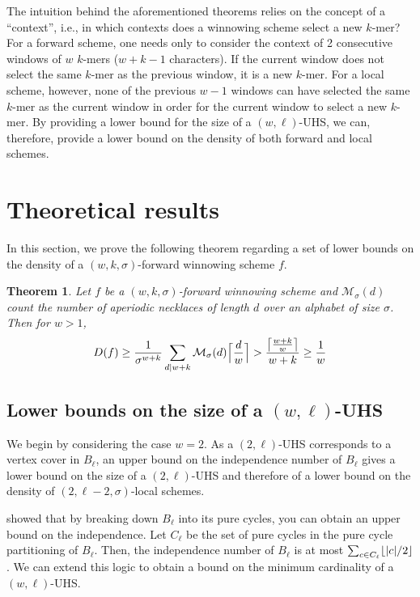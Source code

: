 \documentclass{article}
\newtheorem{theorem}{Theorem}[section]
\DeclarePairedDelimiter\ceil{\lceil}{\rceil}
\DeclarePairedDelimiter\floor{\lfloor}{\rfloor}
\newcommand{\kmer}{{$k$-mer}}
\begin{document}
The intuition behind the aforementioned theorems relies on the concept of a ``context'', i.e., in which contexts does a winnowing scheme select a new \kmer{}? For a forward scheme, one needs only to consider the context of 2 consecutive windows of $w$ $k$-mers ($w + k -1$ characters). If the current window does not select the same \kmer{} as the previous window, it is a new \kmer{}. For a local scheme, however, none of the previous $w-1$ windows can have selected the same \kmer{} as the current window in order for the current window to select a new \kmer{}. By providing a lower bound for the size of a $(w, \ell)$-UHS, we can, therefore, provide a lower bound on the density of both forward and local schemes. 

\section{Theoretical results}

In this section, we prove the following theorem regarding a set of lower bounds on the density of a $(w, k, \sigma)$-forward winnowing scheme $f$. 
\begin{theorem}
 Let $f$  be a $(w, k, \sigma)$-forward winnowing scheme and $\mathcal{M}_\sigma(d)$ count the number of aperiodic necklaces of length $d$ over an alphabet of size $\sigma$. Then for $w>1$,
 $$
D(f) \geq \frac{1}{\sigma^{w+k}}\sum_{d|w+k}\mathcal{M}_\sigma(d)\Big\lceil \frac{d}{w}\Big\rceil > \frac{\ceil*{\frac{w+k}{w}}}{w+k} \geq \frac{1}{w}
$$
\end{theorem}

\subsection{Lower bounds on the size of a $(w, \ell)$-UHS}

We begin by considering the case $w=2$. As a $(2, \ell)$-UHS corresponds to a vertex cover in $B_\ell$, an upper bound on the independence number of $B_{\ell}$ gives a lower bound on the size of a $(2, \ell)$-UHS and therefore of a lower bound on the density of $(2, \ell-2, \sigma)$-local schemes. 

\cite{lichiardopol2006independence} showed that by breaking down $B_\ell$ into its pure cycles, you can obtain an upper bound on the independence. Let $C_\ell$ be the set of pure cycles in the pure cycle partitioning of $B_\ell$. Then, the independence number of $B_\ell$ is at most $\sum_{c\in C_{\ell}}\floor*{{|c|}/{2}}$. We can extend this logic to obtain a bound on the minimum cardinality of a $(w,\ell)$-UHS.
\end{document}

